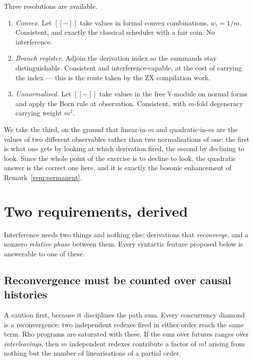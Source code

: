 \documentclass[11pt,a4paper]{article}
\theoremstyle{plain}
\theoremstyle{definition}
\theoremstyle{remark}
\newcommand{\sem}[1]{[\![#1]\!]}
\newcommand{\V}{\mathbb{V}}
\begin{document}
Three resolutions are available.

\begin{enumerate}[leftmargin=1.4em,itemsep=2pt]
\item \emph{Convex.} Let $\sem{-}$ take values in formal convex combinations,
$w_i = 1/m$. Consistent, and exactly the classical scheduler with a fair coin.
No interference.
\item \emph{Branch register.} Adjoin the derivation index so the summands stay
distinguishable. Consistent and interference-capable, at the cost of carrying the
index --- this is the route taken by the ZX compilation work.
\item \emph{Unnormalised.} Let $\sem{-}$ take values in the free $\V$-module on
normal forms and apply the Born rule at observation. Consistent, with $m$-fold
degeneracy carrying weight $m^2$.
\end{enumerate}

We take the third, on the ground that linear-in-$m$ and quadratic-in-$m$ are the
values of two different observables rather than two normalisations of one: the
first is what one gets by looking at which derivation fired, the second by
declining to look. Since the whole point of the exercise is to decline to look,
the quadratic answer is the correct one here, and it is exactly the bosonic
enhancement of Remark~\ref{rem:permanent}.

\section{Two requirements, derived}\label{sec:requirements}

Interference needs two things and nothing else: derivations that
\emph{reconverge}, and a nonzero \emph{relative phase} between them. Every
syntactic feature proposed below is answerable to one of these.

\subsection{Reconvergence must be counted over causal histories}

A caution first, because it disciplines the path sum. Every concurrency diamond
is a reconvergence: two independent redexes fired in either order reach the same
term. Rho programs are saturated with these. If the sum over futures ranges over
\emph{interleavings}, then $m$ independent redexes contribute a factor of $m!$
arising from nothing but the number of linearisations of a partial order.
\end{document}
